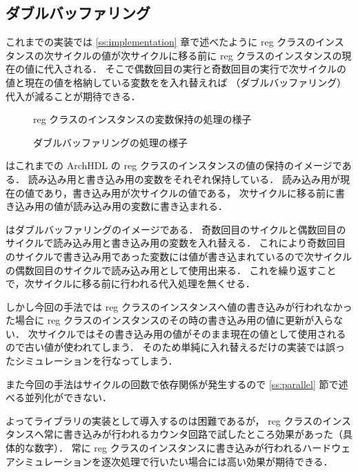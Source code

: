 \subsection{ダブルバッファリング}

これまでの実装では \ref{ss:implementation} 章で述べたように
reg クラスのインスタンスの次サイクルの値が次サイクルに移る前に reg クラスのインスタンスの現在の値に代入される．
そこで偶数回目の実行と奇数回目の実行で次サイクルの値と現在の値を格納している変数をを入れ替えれば
（ダブルバッファリング）代入が減ることが期待できる．

\begin{figure}[t]
 \begin{center}
  
 \end{center}
 \caption{reg クラスのインスタンスの変数保持の処理の様子}
 \label{fig:reg_curr_next}
\end{figure}

\begin{figure}[t]
 \begin{center}
  
 \end{center}
 \caption{ダブルバッファリングの処理の様子}
 \label{fig:double_buffer}
\end{figure}

 はこれまでの ArchHDL の reg クラスのインスタンスの値の保持のイメージである．
読み込み用と書き込み用の変数をそれぞれ保持している．
読み込み用が現在の値であり，書き込み用が次サイクルの値である，
次サイクルに移る前に書き込み用の値が読み込み用の変数に書き込まれる．

はダブルバッファリングのイメージである．
奇数回目のサイクルと偶数回目のサイクルで読み込み用と書き込み用の変数を入れ替える．
これにより奇数回目のサイクルで書き込み用であった変数には値が書き込まれているので次サイクルの偶数回目のサイクルで読み込み用として使用出来る．
これを繰り返すことで，次サイクルに移る前に行われる代入処理を無くせる．

しかし今回の手法では reg クラスのインスタンスへ値の書き込みが行われなかった場合に
reg クラスのインスタンスのその時の書き込み用の値に更新が入らない．
次サイクルではその書き込み用の値がそのまま現在の値として使用されるので古い値が使われてしまう．
そのため単純に入れ替えるだけの実装では誤ったシミュレーションを行なってしまう．

また今回の手法はサイクルの回数で依存関係が発生するので \ref{ss:parallel} 節で述べる並列化ができない．

よってライブラリの実装として導入するのは困難であるが，
reg クラスのインスタンスへ常に書き込みが行われるカウンタ回路で試したところ効果があった（具体的な数字）．
常に reg クラスのインスタンスに書き込みが行われるハードウェアシミュレーションを逐次処理で行いたい場合には高い効果が期待できる．

